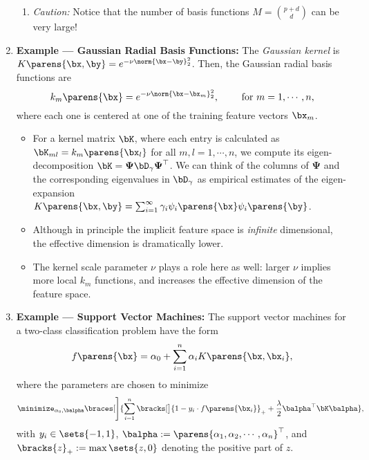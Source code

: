 \documentclass[12pt]{article}
\begin{document}
\begin{enumerate}[label=\textbf{\arabic*.}]
\begin{enumerate}
		\item \textit{Caution:} Notice that the number of basis functions $M = {p+d \choose d}$ can be very large! 
		
	\end{enumerate}
	
	\item \textbf{Example --- Gaussian Radial Basis Functions:} The \textit{Gaussian kernel} is $K \parens{\bx, \by} = e^{-\nu \norm{\bx-\by}_2^2}$. Then, the Gaussian radial basis functions are 
	\begin{equation*}
		k_m \parens{\bx} = e^{-\nu \norm{\bx - \bx_m}_2^2}, \qquad \text{ for } m = 1, \cdots, n, 
	\end{equation*}
	where each one is centered at one of the training feature vectors $\bx_m$. 
	\begin{itemize}
		\item For a kernel matrix $\bK$, where each entry is calculated as $\bK_{ml} = k_m \parens{\bx_l}$ for all $m, l = 1, \cdots, n$, we compute its eigen-decomposition $\bK = \boldsymbol{\Psi} \bD_\gamma \boldsymbol{\Psi}^\top$. We can think of the columns of $\boldsymbol{\Psi}$ and the corresponding eigenvalues in $\bD_\gamma$ as empirical estimates of the eigen-expansion $K \parens{\bx, \by} = \sum_{i=1}^\infty \gamma_i \psi_i \parens{\bx}\psi_i \parens{\by}$. 
		
		\item Although in principle the implicit feature space is \textit{infinite} dimensional, the effective dimension is dramatically lower. 
		
		\item The kernel scale parameter $\nu$ plays a role here as well: larger $\nu$ implies more local $k_m$ functions, and increases the effective dimension of the feature space. 

	\end{itemize}
	
	\item \textbf{Example --- Support Vector Machines:} The support vector machines for a two-class classification problem have the form
	\begin{align*}
		f \parens{\bx} = \alpha_0 + \sum_{i=1}^n \alpha_i K \parens{\bx, \bx_i}, 
	\end{align*}
	where the parameters are chosen to minimize
	\begin{equation}\label{eq-svm}
		\minimize_{\alpha_0, \balpha} \braces[\Bigg]{ \sum_{i=1}^n \bracks[\big]{ 1 - y_i \cdot f \parens{\bx_i}}_+ + \frac{\lambda}{2} \balpha^\top \bK \balpha }, 
	\end{equation}
	with $y_i \in \sets{-1, 1}$, $\balpha := \parens{\alpha_1, \alpha_2, \cdots, \alpha_n}^\top$, and $\bracks{z}_+ := \max \sets{z, 0}$ denoting the positive part of $z$. 
	

\end{enumerate}
\end{document}
